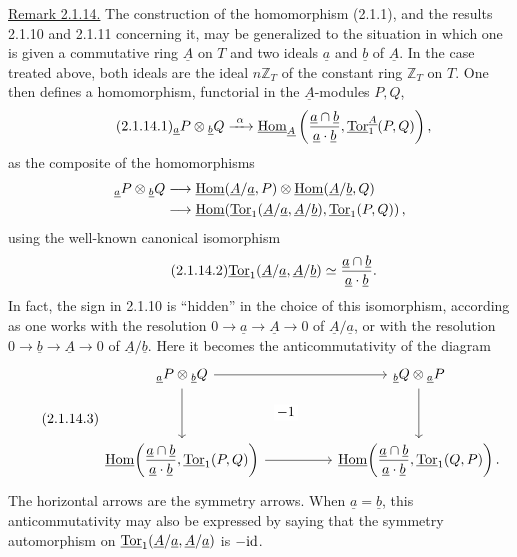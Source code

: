 \medskip
\noindent\underline{Remark 2.1.14.}
The construction of the homomorphism (2.1.1), and the results 2.1.10
and 2.1.11 concerning it, may be generalized to the situation in
which one is given a commutative ring $\underline A$ on $T$ and two
ideals $\underline a$ and $\underline b$ of $\underline A$.  In the
case treated above, both ideals are the ideal
$n\mathbb Z_T$ of the constant ring $\mathbb Z_T$ on $T$.  One then
defines a homomorphism, functorial in the $\underline A$-modules
$P,Q$,
\begin{equation}\tag{2.1.14.1}
 {}_{\underline a}P\otimes{}_{\underline b}Q
 \xrightarrow{\ \alpha\ }
 \uHom_{\underline A}
 \left(
   \frac{\underline a\cap\underline b}
        {\underline a\mathbin{\cdot}\underline b},
   \uTor^{\underline A}_1(P,Q)
 \right),
\end{equation}
as the composite of the homomorphisms
\[
\begin{split}
 {}_{\underline a}P\otimes{}_{\underline b}Q
 &\longrightarrow
 \uHom(\underline A/\underline a,P)
 \otimes
 \uHom(\underline A/\underline b,Q)\\
 &\longrightarrow
 \uHom\!\left(
   \uTor_1(\underline A/\underline a,\underline A/\underline b),
   \uTor_1(P,Q)
 \right),
\end{split}
\]
using the well-known canonical isomorphism
\begin{equation}\tag{2.1.14.2}
 \uTor_1(\underline A/\underline a,\underline A/\underline b)
 \simeq
 \frac{\underline a\cap\underline b}
      {\underline a\mathbin{\cdot}\underline b}.
\end{equation}
In fact, the sign in 2.1.10 is ``hidden'' in the choice of this
isomorphism, according as one works with the resolution
$0\longrightarrow\underline a\longrightarrow\underline A
\longrightarrow0$ of $\underline A/\underline a$, or with the
resolution $0\longrightarrow\underline b\longrightarrow\underline A
\longrightarrow0$ of $\underline A/\underline b$.  Here it becomes
the anticommutativity of the diagram
\begin{equation}\tag{2.1.14.3}
\begin{tikzcd}[column sep=huge,row sep=huge]
 {}_{\underline a}P\otimes{}_{\underline b}Q
   \arrow[r]
   \arrow[d]
   \arrow[rd,phantom,"-1" description]&
 {}_{\underline b}Q\otimes{}_{\underline a}P
   \arrow[d]\\
 \uHom\!\left(
   \dfrac{\underline a\cap\underline b}
         {\underline a\mathbin{\cdot}\underline b},
   \uTor_1(P,Q)
 \right)
   \arrow[r]&
 \uHom\!\left(
   \dfrac{\underline a\cap\underline b}
         {\underline a\mathbin{\cdot}\underline b},
   \uTor_1(Q,P)
 \right).
\end{tikzcd}
\end{equation}
The horizontal arrows are the symmetry arrows.  When
$\underline a=\underline b$, this anticommutativity may also be
expressed by saying that the symmetry automorphism on
$\uTor_1(\underline A/\underline a,\underline A/\underline a)$ is
$-\mathrm{id}$.

